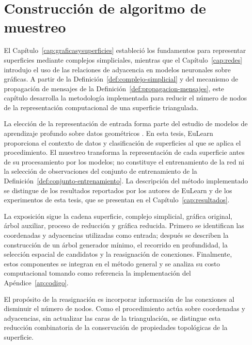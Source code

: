 \chapter{Construcción de algoritmo de muestreo}\label{cap:muestreo}

El Capítulo~\ref{cap:graficasysuperficies} estableció los fundamentos para representar superficies mediante complejos simpliciales, mientras que el Capítulo~\ref{cap:redes} introdujo el uso de las relaciones de adyacencia en modelos neuronales sobre gráficas. A partir de la Definición~\ref{def:complejo-simplicial} y del mecanismo de propagación de mensajes de la Definición~\ref{def:propagacion-mensajes}, este capítulo desarrolla la metodología implementada para reducir el número de nodos de la representación computacional de una superficie triangulada.

La elección de la representación de entrada forma parte del estudio de modelos de aprendizaje profundo sobre datos geométricos \cite{Goodfellow-et-al-2016,bronstein2021geometric}. En esta tesis, EuLearn \cite{2025eulearn} proporciona el contexto de datos y clasificación de superficies al que se aplica el procedimiento. El muestreo transforma la representación de cada superficie antes de su procesamiento por los modelos; no constituye el entrenamiento de la red ni la selección de observaciones del conjunto de entrenamiento de la Definición~\ref{def:conjunto-entrenamiento}. La descripción del método implementado se distingue de los resultados reportados por los autores de EuLearn y de los experimentos de esta tesis, que se presentan en el Capítulo~\ref{cap:resultados}.

La exposición sigue la cadena superficie, complejo simplicial, gráfica original, árbol auxiliar, proceso de reducción y gráfica reducida. Primero se identifican las coordenadas y adyacencias utilizadas como entrada; después se describen la construcción de un árbol generador mínimo, el recorrido en profundidad, la selección espacial de candidatos y la reasignación de conexiones. Finalmente, estos componentes se integran en el método general y se analiza su costo computacional tomando como referencia la implementación del Apéndice~\ref{ap:codigo}.

El propósito de la reasignación es incorporar información de las conexiones al disminuir el número de nodos. Como el procedimiento actúa sobre coordenadas y adyacencias, sin actualizar las caras de la triangulación, se distingue esta reducción combinatoria de la conservación de propiedades topológicas de la superficie.

